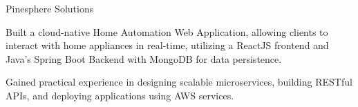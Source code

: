    {Pinesphere Solutions} {}
    \resumeItemListStart                
          {
    \item Built a cloud-native Home Automation Web Application, allowing clients to interact with home appliances in real-time, utilizing a ReactJS frontend and Java's Spring Boot Backend with MongoDB for data persistence.
  \item Gained practical experience in designing scalable microservices, building RESTful APIs, and deploying applications using AWS services.
  }
\resumeItemListEnd

\resumeSubHeadingListEnd
\vspace{5pt}

